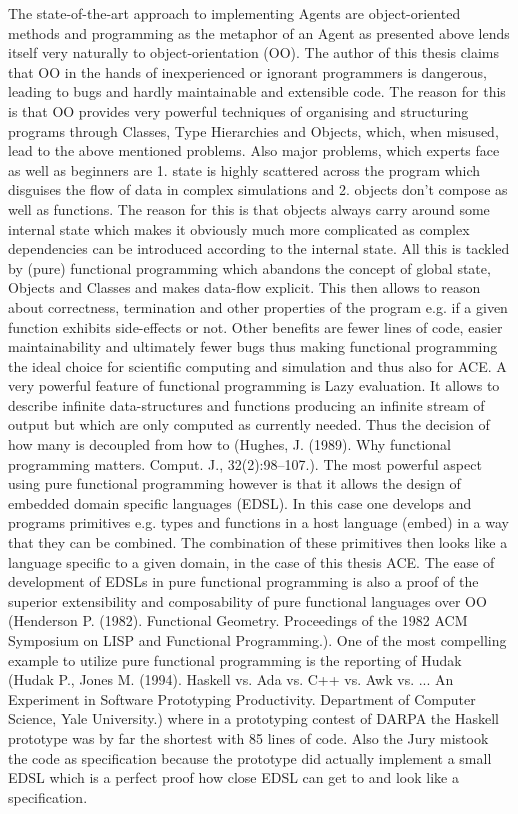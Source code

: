 The state-of-the-art approach to implementing Agents are object-oriented methods and programming as the metaphor of an Agent as presented above lends itself very naturally to object-orientation (OO). The author of this thesis claims that OO in the hands of inexperienced or ignorant programmers is dangerous, leading to bugs and hardly maintainable and extensible code. The reason for this is that OO provides very powerful techniques of organising and structuring programs through Classes, Type Hierarchies and Objects, which, when misused, lead to the above mentioned problems. Also major problems, which experts face as well as beginners are 1. state is highly scattered across the program which disguises the flow of data in complex simulations and 2. objects don’t compose as well as functions. The reason for this is that objects always carry around some internal state which makes it obviously much more complicated as complex dependencies can be introduced according to the internal state.
All this is tackled by (pure) functional programming which abandons the concept of global state, Objects and Classes and makes data-flow explicit. This then allows to reason about correctness, termination and other properties of the program e.g. if a given function exhibits side-effects or not. Other benefits are fewer lines of code, easier maintainability and ultimately fewer bugs thus making functional programming the ideal choice for scientific computing and simulation and thus also for ACE. A very powerful feature of functional programming is Lazy evaluation. It allows to describe infinite data-structures and functions producing an infinite stream of output but which are only computed as currently needed. Thus the decision of how many is decoupled from how to (Hughes, J. (1989). Why functional programming matters. Comput. J., 32(2):98–107.).
The most powerful aspect using pure functional programming however is that it allows the design of embedded domain specific languages (EDSL). In this case one develops and programs primitives e.g. types and functions in a host language (embed) in a way that they can be combined. The combination of these primitives then looks like a language specific to a given domain, in the case of this thesis ACE. The ease of development of EDSLs in pure functional programming is also a proof of the superior extensibility and composability of pure functional languages over OO (Henderson P. (1982). Functional Geometry. Proceedings of the 1982 ACM Symposium on LISP and Functional Programming.).
One of the most compelling example to utilize pure functional programming is the reporting of Hudak (Hudak P., Jones M. (1994). Haskell vs. Ada vs. C++ vs. Awk vs. ... An Experiment in Software Prototyping Productivity. Department of Computer Science, Yale University.)  where in a prototyping contest of DARPA the Haskell prototype was by far the shortest with 85 lines of code. Also the Jury mistook the code as specification because the prototype did actually implement a small EDSL which is a perfect proof how close EDSL can get to and look like a specification.

